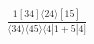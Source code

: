 \documentclass[varwidth, border=5pt]{standalone}
\begin{document}
\begin{my}
$\begin{gathered}
\scriptscriptstyle\frac{1[34]⟨24⟩[15]}{⟨34⟩⟨45⟩⟨4|1+5|4]}
\end{gathered}$
\end{my}
\end{document}
